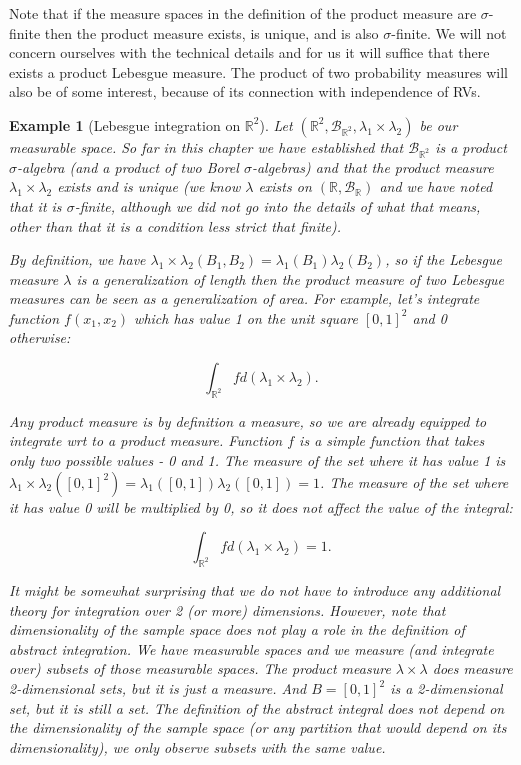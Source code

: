 \documentclass{book}
\theoremstyle{plain}%
\newtheorem{prototheorem}{Example}[section]
\newenvironment{cexample}
   {\colorlet{shadecolor}{gray!10}\begin{shaded}\begin{prototheorem}}
   {\end{prototheorem}\end{shaded}}
\theoremstyle{definition}
\begin{document}
Note that if the measure spaces in the definition of the product measure are $\sigma$-finite then the product measure exists, is unique, and is also $\sigma$-finite. We will not concern ourselves with the technical details and for us it will suffice that there exists a product Lebesgue measure. The product of two probability measures will also be of some interest, because of its connection with independence of RVs.

\begin{cexample}[Lebesgue integration on $\mathbb{R}^2$] Let $(\mathbb{R}^2, \mathcal{B}_{\mathbb{R}^2}, \lambda_1 \times \lambda_2)$ be our measurable space. So far in this chapter we have established that $\mathcal{B}_{\mathbb{R}^2}$ is a product $\sigma$-algebra (and a product of two Borel $\sigma$-algebras) and that the product measure $\lambda_1 \times \lambda_2$ exists and is unique (we know $\lambda$ exists on $(\mathbb{R}, \mathcal{B}_{\mathbb{R}})$ and we have noted that it is $\sigma$-finite, although we did not go into the details of what that means, other than that it is a condition less strict that finite).

By definition, we have $\lambda_1 \times \lambda_2(B_1, B_2) = \lambda_1(B_1)\lambda_2(B_2)$, so if the Lebesgue measure $\lambda$ is a generalization of length then the product measure of two Lebesgue measures can be seen as a generalization of area. For example, let's integrate function $f(x_1, x_2)$ which has value 1 on the unit square $[0, 1]^2$ and 0 otherwise:

$$\int_{\mathbb{R}^2} f d(\lambda_1 \times \lambda_2).$$

Any product measure is by definition a measure, so we are already equipped to integrate wrt to a product measure. Function $f$ is a simple function that takes only two possible values - 0 and 1. The measure of the set where it has value 1 is $\lambda_1 \times \lambda_2([0, 1]^2) = \lambda_1([0, 1]) \lambda_2([0, 1])= 1$. The measure of the set where it has value 0 will be multiplied by 0, so it does not affect the value of the integral:

$$\int_{\mathbb{R}^2} f d(\lambda_1 \times \lambda_2) = 1.$$

It might be somewhat surprising that we do not have to introduce any additional theory for integration over 2 (or more) dimensions. However, note that dimensionality of the sample space does not play a role in the definition of abstract integration. We have measurable spaces and we measure (and integrate over) subsets of those measurable spaces. The product measure $\lambda \times \lambda$ does measure 2-dimensional sets, but it is just a measure. And $B = [0, 1]^2$ is a 2-dimensional set, but it is still a set. The definition of the abstract integral does not depend on the dimensionality of the sample space (or any partition that would depend on its dimensionality), we only observe subsets with the same value.
\end{cexample}
\end{document}
